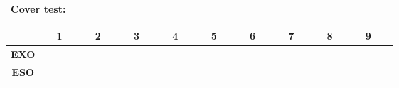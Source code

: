 \\\ \\\ \\\
\textbf{Cover test:}
\begin{table}[H]
\begin{tabular}{|c|c|c|c|c|c|c|c|c|c|} \hline
{\textbf{}} & {\ \ \textbf{1}\ \ } & {\ \ \textbf{2}\ \ } & {\ \ \textbf{3}\ \ } & {\ \ \textbf{4}\ \ } & {\ \ \textbf{5}\ \ } & {\ \ \textbf{6}\ \ } & {\ \ \textbf{7}\ \ } & {\ \ \textbf{8}\ \ } & {\ \ \textbf{9}\ \ \ }\\ \hline
\textbf{EXO}} &  &  &  &  &  &  &  &  & \\ \hline
\textbf{ESO}}  &  &  &  &  &  &  &  &  & \\ \hline
\end{tabular}
\end{table}

